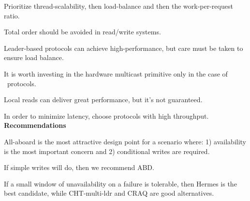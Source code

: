 \squishlist
\item %
Prioritize thread-scalability, then load-balance and then the work-per-request ratio.
\item Total order should be avoided in read/write systems.
\item Leader-based protocols can achieve high-performance, but care must be taken to ensure load balance. 
\item It is worth investing in the hardware multicast primitive only in the case of \LPKO\ protocols. 
\item Local reads can deliver great performance, but it's not guaranteed.
\item In order to minimize latency, choose protocols with high throughput.
\squishend
\noindent\textbf{Recommendations}
\squishlistContrib
\item All-aboard is the most attractive design point for a scenario where: 1) availability is the most important concern and 2) conditional writes are required.
\item If simple writes will do, then we recommend ABD.
\item If a small window of unavailability on a failure is tolerable, then Hermes is the best candidate, while CHT-multi-ldr and CRAQ are good alternatives.
\squishend 
\begin{comment}


\beginbsec{\tabref{tab:all-perf}: Throughput \& Latency}
The left-hand side of \tabref{tab:all-perf} shows the throughput in M.reqs/s of all \pnum~protocols (plus CHT-mcast) when varying the write ratio. 
Throughout this section, we plot the throughput measurements from this table whenever necessary.

The right-hand side shows the latency (99th / average) of all protocols in microseconds at 100\% write ratio, while varying the load of the protocol (\ie with respect to peak throughput). 
In ZAB, MP and CHT variants, we have measured the latency at a follower node. In CRAQ, we have measured the latency at the head node.
\end{comment}
